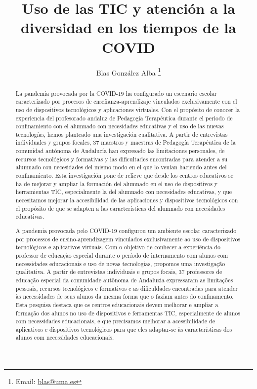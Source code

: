 \documentclass{textolivre}
\title{Uso de las TIC y atención a la diversidad en los tiempos de  la COVID}
\author[1]{Blas González Alba \orcid{0000-0002-4769-6522} \thanks{Email: \url{blas@uma.es}}}
\affil[1]{Universidad de Málaga, Facultad de
Ciencias de la Educación, Departamento de didáctica y organización
escolar. Málaga, Andalucía y España.}
\begin{document}
\maketitle

\begin{polyabstract}
\begin{abstract}
La pandemia provocada por la COVID-19 ha configurado un escenario escolar caracterizado por procesos de enseñanza-aprendizaje vinculados exclusivamente con el uso de dispositivos tecnológicos y aplicaciones virtuales. Con el propósito de conocer la experiencia del profesorado andaluz de Pedagogía Terapéutica durante el periodo de confinamiento con el alumnado con necesidades educativas y el uso de las nuevas tecnologías, hemos planteado una investigación cualitativa. A partir de entrevistas individuales y grupos focales, 37 maestros y maestras de Pedagogía Terapéutica de la comunidad autónoma de Andalucía han expresado las limitaciones personales, de recursos tecnológicos y formativas y las dificultades encontradas para atender a su alumnado con necesidades del mismo modo en el que lo venían haciendo antes del confinamiento. Esta investigación pone de relieve que desde los centros educativos se ha de mejorar y ampliar la formación del alumnado en el uso de dispositivos y herramientas TIC, especialmente la del alumnado con necesidades educativas, y que necesitamos mejorar la accesibilidad de las aplicaciones y dispositivos tecnológicos con el propósito de que se adapten a las características del alumnado con necesidades educativas. 

\end{abstract}

\begin{portuguese}
\begin{abstract}
A pandemia provocada pelo COVID-19 configurou um ambiente escolar caracterizado por processos de ensino-aprendizagem vinculados exclusivamente ao uso de dispositivos tecnológicos e aplicativos virtuais. Com o objetivo de conhecer a experiência do professor de educação especial durante o período de internamento com alunos com necessidades educacionais e uso de novas tecnologias, propomos uma investigação qualitativa. A partir de entrevistas individuais e grupos focais, 37 professores de educação especial da comunidade autônoma de Andaluzia expressaram as limitações pessoais, recursos tecnológicos e formativos e as dificuldades encontradas para atender às necessidades de seus alunos da mesma forma que o faziam antes do confinamento. Esta pesquisa destaca que os centros educacionais devem melhorar e ampliar a formação dos alunos no uso de dispositivos e ferramentas TIC, especialmente de alunos com necessidades educacionais, e que precisamos melhorar a acessibilidade de aplicativos e dispositivos tecnológicos para que eles adaptar-se às características dos alunos com necessidades educacionais.


\end{abstract}
\end{portuguese}
\end{polyabstract}
\end{document}
